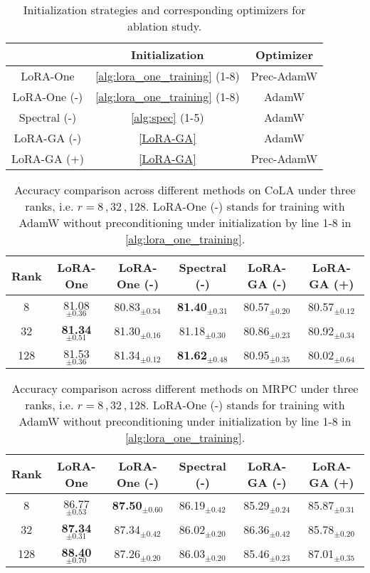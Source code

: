 \begin{table}[ht]
    \centering
    \caption{Initialization strategies and corresponding optimizers for ablation study.}
    \begin{tabular}{ccc}
      \toprule
         & Initialization & Optimizer \\
      \midrule
      LoRA-One   &\cref{alg:lora_one_training} (1-8) & Prec-AdamW\\
      LoRA-One (-) &\cref{alg:lora_one_training} (1-8) & AdamW\\
      Spectral (-) &\cref{alg:spec} (1-5) & AdamW\\
      LoRA-GA (-) &\eqref{LoRA-GA} & AdamW\\
      LoRA-GA (+) &\eqref{LoRA-GA} & Prec-AdamW\\
      \bottomrule
    \end{tabular}
    \label{tab:descrip-alg}
\end{table}

\begin{table}[h!]
\centering
\caption{Accuracy comparison across different methods on CoLA under three ranks, i.e. $r=8\,,32\,,128$. LoRA-One (-) stands for training with AdamW without preconditioning under initialization by line 1-8 in \cref{alg:lora_one_training}.}
\label{tab:ab-cola}
\begin{tabular}{cccccc}
\toprule
\textbf{Rank} & LoRA-One & LoRA-One (-) & Spectral (-) & LoRA-GA (-) & LoRA-GA (+) \\
\midrule
8 & {81.08}$_{\pm 0.36}$ & 80.83$_{\pm 0.54}$ &\textbf{81.40}$_{\pm 0.31}$  & 80.57$_{\pm 0.20}$ & 80.57$_{\pm 0.12}$\\
32 & \textbf{81.34}$_{\pm 0.51}$ & 81.30$_{\pm 0.16}$ &81.18$_{\pm 0.30}$& 80.86$_{\pm 0.23}$ & 80.92$_{\pm 0.34}$\\
128 & {81.53}$_{\pm 0.36}$ & 81.34$_{\pm 0.12}$ &\textbf{81.62}$_{\pm 0.48}$& 80.95$_{\pm 0.35}$ & 80.02$_{\pm 0.64}$\\
\bottomrule
\end{tabular}
\end{table}

\begin{table}[h!]
\centering
\caption{Accuracy comparison across different methods on MRPC under three ranks, i.e. $r=8\,,32\,,128$. LoRA-One (-) stands for training with AdamW without preconditioning under initialization by line 1-8 in \cref{alg:lora_one_training}.}
\begin{tabular}{cccccc}
\toprule
\textbf{Rank} & LoRA-One & LoRA-One (-) & Spectral (-) & LoRA-GA (-) & LoRA-GA (+) \\
\midrule
8 & 86.77$_{\pm 0.53}$ & \textbf{87.50}$_{\pm 0.60}$ &86.19$_{\pm 0.42}$& 85.29$_{\pm 0.24}$& 85.87$_{\pm 0.31}$\\
32 & \textbf{87.34}$_{\pm 0.31}$ & 87.34$_{\pm 0.42}$ &86.02$_{\pm 0.20}$& 86.36$_{\pm 0.42}$ &85.78$_{\pm 0.20}$\\
128 & \textbf{88.40}$_{\pm 0.70}$ & 87.26$_{\pm 0.20}$ &86.03$_{\pm 0.20}$& 85.46$_{\pm 0.23}$ &87.01$_{\pm 0.35}$\\
\bottomrule
\end{tabular}
\label{tab:ab-mrpc}
\end{table}

